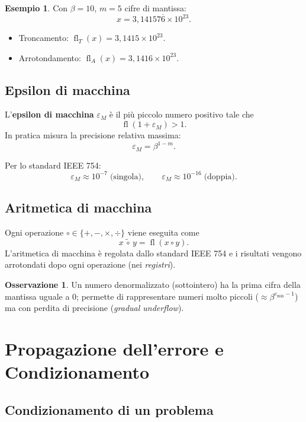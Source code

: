 \documentclass[12pt,a4paper]{article}
\theoremstyle{definition}
\newtheorem{osservazione}{Osservazione}[section]
\newtheorem{esempio}{Esempio}[section]
\begin{document}
\begin{esempio}
Con $\beta = 10$, $m = 5$ cifre di mantissa:
\[
  x = 3{,}14157\overline{6}\times 10^{23}.
\]
\begin{itemize}
  \item Troncamento: $\operatorname{fl}_T(x) = 3{,}1415 \times 10^{23}$.
  \item Arrotondamento: $\operatorname{fl}_A(x) = 3{,}1416 \times 10^{23}$.
\end{itemize}
\end{esempio}

\subsection{Epsilon di macchina}

L'\textbf{epsilon di macchina} $\varepsilon_M$ è il più piccolo numero positivo tale che
\[
  \operatorname{fl}(1 + \varepsilon_M) > 1.
\]
In pratica misura la precisione relativa massima:
\[
  \varepsilon_M = \beta^{1-m}.
\]

Per lo standard IEEE 754:
\[
  \varepsilon_M \approx 10^{-7} \;\text{(singola)}, \qquad
  \varepsilon_M \approx 10^{-16} \;\text{(doppia)}.
\]

\subsection{Aritmetica di macchina}

Ogni operazione $\circ \in \{+,-,\times,\div\}$ viene eseguita come
\[
  x \,\tilde{\circ}\, y = \operatorname{fl}(x \circ y).
\]
L'aritmetica di macchina è regolata dallo standard IEEE 754 e i risultati vengono arrotondati dopo ogni operazione (nei \emph{registri}).

\begin{osservazione}
Un numero denormalizzato (sottointero) ha la prima cifra della mantissa uguale a $0$; permette di rappresentare numeri molto piccoli ($\approx \beta^{e_{\min}-1}$) ma con perdita di precisione (\emph{gradual underflow}).
\end{osservazione}

\section{Propagazione dell'errore e Condizionamento}

\subsection{Condizionamento di un problema}
\end{document}
